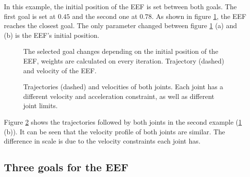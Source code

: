 In this example, the initial position of the EEF is set between both goals. The first goal is set at $0.45$ and the second one at $0.78$. As shown in figure \ref{fig:dynamic}, the EEF reaches the closest goal. The only parameter changed between figure \ref{fig:dynamic} (a) and (b) is the EEF's initial position. 
\begin{figure}[H]
	\centering
	\begin{subfigure}[EEF closer to goal 2 (thick dotted line)]
		{\texttt{[image: controllers/dynamic\_1.png]}}
	\end{subfigure}
	\begin{subfigure}[EEF closer to goal 1 (thin dotted line)]
		{\texttt{[image: controllers/dynamic\_2.png]}}
	\end{subfigure}
	\vspace{-12pt}
	\caption[Dynamic weights: EEF]{The selected goal changes depending on the initial position of the EEF, weights are calculated on every iteration. Trajectory (dashed) and velocity of the EEF.}
	\vspace{-10pt}
	\label{fig:dynamic}
\end{figure}

\begin{figure}[H]
	\centering
	\begin{subfigure}[Joint $q_0$]
		{\texttt{[image: controllers/dynamic\_3.png]}}
	\end{subfigure}
	\begin{subfigure}[Joint $q_1$]
		{\texttt{[image: controllers/dynamic\_4.png]}}
	\end{subfigure}
	\vspace{-12pt}
	\caption[Dynamic weights: Joints]{Trajectories (dashed) and velocities of both joints. Each joint has a different velocity and acceleration constraint, as well as different joint limits.}
	\vspace{-10pt}
	\label{fig:dynamic_j}
\end{figure}

Figure \ref{fig:dynamic_j} shows the trajectories followed by both joints in the second example (\ref{fig:dynamic} (b)). It can be seen that the velocity profile of both joints are similar. The difference in scale is due to the velocity constraints each joint has.

\subsection{Three goals for the EEF}

